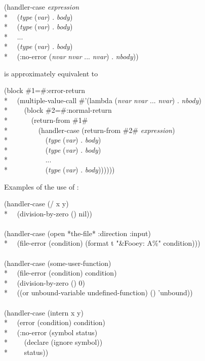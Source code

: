 \begin{defmac}
\begin{lisp}
(handler-case \emph{expression} \\*
~~(\emph{type} (\emph{var}) . \emph{body}) \\*
~~(\emph{type} (\emph{var}) . \emph{body}) \\*
~~... \\*
~~(\emph{type} (\emph{var}) . \emph{body}) \\*
~~(:no-error (\emph{nvar} \emph{nvar} ... \emph{nvar}) . \emph{nbody}))
\end{lisp}
is approximately equivalent to
\begin{lisp}
(block \#1=\#:error-return \\*
~~(multiple-value-call \#'(lambda (\emph{nvar} \emph{nvar} ... \emph{nvar}) . \emph{nbody}) \\*
~~~~(block \#2=\#:normal-return \\*
~~~~~~(return-from \#1\# \\*
~~~~~~~~(handler-case (return-from \#2\# \emph{expression}) \\*
~~~~~~~~~~(\emph{type} (\emph{var}) . \emph{body}) \\*
~~~~~~~~~~(\emph{type} (\emph{var}) . \emph{body}) \\*
~~~~~~~~~~... \\*
~~~~~~~~~~(\emph{type} (\emph{var}) . \emph{body}))))))
\end{lisp}



  Examples of the use of :
\begin{lisp}
(handler-case (/ x y) \\*
~~(division-by-zero () nil)) \\
 \\
(handler-case (open *the-file* :direction :input) \\*
~~(file-error (condition) (format t "{\Xtilde}\&Fooey: {\Xtilde}A{\Xtilde}\%" condition))) \\
 \\
(handler-case (some-user-function) \\*
~~(file-error (condition) condition) \\*
~~(division-by-zero () 0) \\*
~~((or unbound-variable undefined-function) () 'unbound)) \\
 \\
(handler-case (intern x y) \\*
~~(error (condition) condition) \\*
~~(:no-error (symbol status) \\*
~~~~(declare (ignore symbol)) \\*
~~~~status))
\end{lisp}
\end{defmac}


